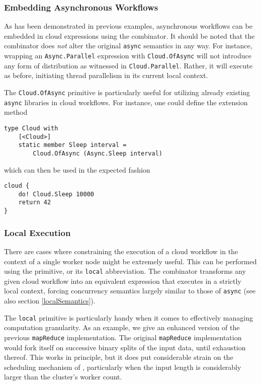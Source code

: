 \subsubsection*{Embedding Asynchronous Workflows}

As has been demonstrated in previous examples, asynchronous workflows can be
embedded in cloud expressions using the
combinator. It should be noted that the combinator does \emph{not} alter the
original \texttt{async} semantics in any way. For instance, wrapping an
\texttt{Async.Parallel} expression with \texttt{Cloud.OfAsync} will not introduce
any form of distribution as witnessed in \texttt{Cloud.Parallel}. Rather,
it will execute as before, initiating thread parallelism in its current
local context.

The \texttt{Cloud.OfAsync} primitive is particularly useful for utilizing
already existing \texttt{async} libraries in cloud workflows. For instance,
one could define the extension method
\begin{lstlisting}
type Cloud with
    [<Cloud>]
    static member Sleep interval = 
    	Cloud.OfAsync (Async.Sleep interval)
\end{lstlisting}
which can then be used in the expected fashion
\begin{lstlisting}
cloud {
    do! Cloud.Sleep 10000
    return 42
}
\end{lstlisting}

\subsubsection*{Local Execution}
\label{localCombinator}

There are cases where constraining the execution of a cloud workflow in the context of a
single worker node might be extremely useful. This can be performed using the
primitive, or its \texttt{local} abbreviation. The combinator transforms any given
cloud workflow into an equivalent expression that executes in a strictly local context,
forcing concurrency semantics largely similar to those of \texttt{async} (see also section \ref{localSemantics}).

The \texttt{local} primitive is particularly handy when it comes to effectively managing 
computation granularity. As an example, we give an enhanced version of the previous 
\texttt{mapReduce} implementation. The original \texttt{mapReduce} implementation would 
fork itself on successive binary splits of the input data, until exhaustion thereof.
This works in principle, but it does put considerable strain on the scheduling mechanism of
\mbrace, particularly when the input length is considerably larger than the cluster's
worker count.

